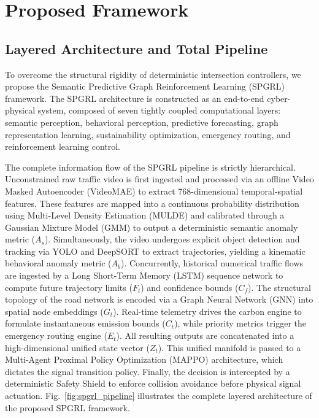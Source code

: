 \section{Proposed Framework}
\label{sec:proposed_framework}

\subsection{Layered Architecture and Total Pipeline}
To overcome the structural rigidity of deterministic intersection controllers, we propose the Semantic Predictive Graph Reinforcement Learning (SPGRL) framework. The SPGRL architecture is constructed as an end-to-end cyber-physical system, composed of seven tightly coupled computational layers: semantic perception, behavioral perception, predictive forecasting, graph representation learning, sustainability optimization, emergency routing, and reinforcement learning control. 

The complete information flow of the SPGRL pipeline is strictly hierarchical. Unconstrained raw traffic video is first ingested and processed via an offline Video Masked Autoencoder (VideoMAE) to extract 768-dimensional temporal-spatial features. These features are mapped into a continuous probability distribution using Multi-Level Density Estimation (MULDE) and calibrated through a Gaussian Mixture Model (GMM) to output a deterministic semantic anomaly metric ($A_s$). Simultaneously, the video undergoes explicit object detection and tracking via YOLO and DeepSORT to extract trajectories, yielding a kinematic behavioral anomaly metric ($A_b$). Concurrently, historical numerical traffic flows are ingested by a Long Short-Term Memory (LSTM) sequence network to compute future trajectory limits ($F_t$) and confidence bounds ($C_f$). The structural topology of the road network is encoded via a Graph Neural Network (GNN) into spatial node embeddings ($G_t$). Real-time telemetry drives the carbon engine to formulate instantaneous emission bounds ($C_t$), while priority metrics trigger the emergency routing engine ($E_t$). All resulting outputs are concatenated into a high-dimensional unified state vector ($Z_t$). This unified manifold is passed to a Multi-Agent Proximal Policy Optimization (MAPPO) architecture, which dictates the signal transition policy. Finally, the decision is intercepted by a deterministic Safety Shield to enforce collision avoidance before physical signal actuation. Fig.~\ref{fig:spgrl_pipeline} illustrates the complete layered architecture of the proposed SPGRL framework.

